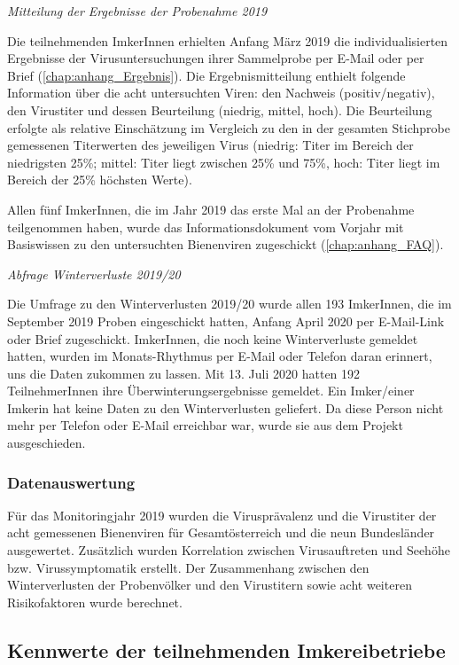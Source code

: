 \textit{Mitteilung der Ergebnisse der Probenahme 2019}

Die teilnehmenden ImkerInnen erhielten Anfang März 2019 die individualisierten Ergebnisse der Virusuntersuchungen ihrer Sammelprobe per E-Mail oder per Brief (\cref{chap:anhang_Ergebnis}). Die Ergebnismitteilung enthielt folgende Information über die acht untersuchten Viren: den Nachweis (positiv/negativ), den Virustiter und dessen Beurteilung (niedrig, mittel, hoch). Die Beurteilung erfolgte als relative Einschätzung im Vergleich zu den in der gesamten Stichprobe gemessenen Titerwerten des jeweiligen Virus (niedrig: Titer im Bereich der niedrigsten 25\%; mittel: Titer liegt zwischen 25\% und 75\%, hoch: Titer liegt im Bereich der 25\% höchsten Werte).

Allen fünf ImkerInnen, die im Jahr 2019 das erste Mal an der Probenahme teilgenommen haben, wurde das Informationsdokument vom Vorjahr mit Basiswissen zu den untersuchten Bienenviren zugeschickt (\cref{chap:anhang_FAQ}).


\textit{Abfrage Winterverluste 2019/20}

Die Umfrage zu den Winterverlusten 2019/20 wurde allen 193 ImkerInnen, die im September 2019 Proben eingeschickt hatten, Anfang April 2020 per E-Mail-Link oder Brief zugeschickt. ImkerInnen, die noch keine Winterverluste gemeldet hatten, wurden im Monats-Rhythmus per E-Mail oder Telefon daran erinnert, uns die Daten zukommen zu lassen. Mit 13. Juli 2020 hatten 192 TeilnehmerInnen ihre Überwinterungsergebnisse gemeldet. Ein Imker/einer Imkerin hat keine Daten zu den Winterverlusten geliefert. Da diese Person nicht mehr per Telefon oder E-Mail erreichbar war, wurde sie aus dem Projekt ausgeschieden.

\subsubsection{Datenauswertung}

Für das Monitoringjahr 2019 wurden die Virusprävalenz und die Virustiter der acht gemessenen Bienenviren für Gesamtösterreich und die neun Bundesländer ausgewertet. Zusätzlich wurden Korrelation zwischen Virusauftreten und Seehöhe bzw. Virussymptomatik erstellt. Der Zusammenhang zwischen den Winterverlusten der Probenvölker und den Virustitern sowie acht weiteren Risikofaktoren wurde berechnet. 

\subsection{Kennwerte der teilnehmenden Imkereibetriebe}

